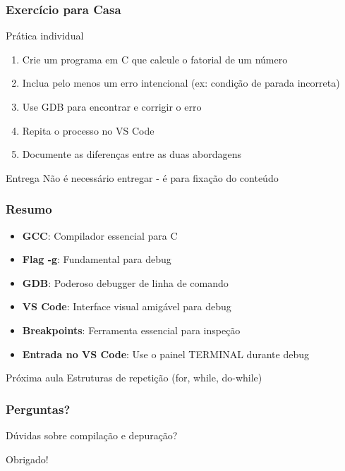 \documentclass[aspectratio=169]{beamer}
\begin{document}
\begin{frame}
\frametitle{Exercício para Casa}
\begin{block}{Prática individual}
\begin{enumerate}
    \item Crie um programa em C que calcule o fatorial de um número
    \item Inclua pelo menos um erro intencional (ex: condição de parada incorreta)
    \item Use GDB para encontrar e corrigir o erro
    \item Repita o processo no VS Code
    \item Documente as diferenças entre as duas abordagens
\end{enumerate}
\end{block}

\begin{block}{Entrega}
Não é necessário entregar - é para fixação do conteúdo
\end{block}
\end{frame}

\begin{frame}
\frametitle{Resumo}
\begin{itemize}
    \item \textbf{GCC}: Compilador essencial para C
    \item \textbf{Flag -g}: Fundamental para debug
    \item \textbf{GDB}: Poderoso debugger de linha de comando
    \item \textbf{VS Code}: Interface visual amigável para debug
    \item \textbf{Breakpoints}: Ferramenta essencial para inspeção
    \item \textbf{Entrada no VS Code}: Use o painel TERMINAL durante debug
\end{itemize}

\begin{block}{Próxima aula}
Estruturas de repetição (for, while, do-while)
\end{block}
\end{frame}

\begin{frame}
\frametitle{Perguntas?}
\begin{center}
{\Large Dúvidas sobre compilação e depuração?}

\vspace{1cm}

{\large Obrigado!}
\end{center}
\end{frame}
\end{document}
